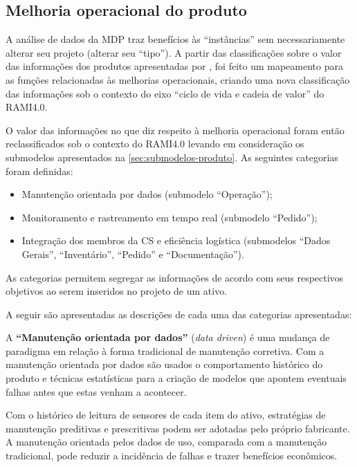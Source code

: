 \subsection{Melhoria operacional do produto}
\label{sub:melhoria-operacional}

A análise de dados da MDP traz benefícios às ``instâncias'' sem necessariamente alterar seu projeto (alterar seu ``tipo''). A partir das classificações sobre o valor das informações dos produtos apresentadas por , foi feito um mapeamento para as funções relacionadas às melhorias operacionais, criando uma nova classificação das informações sob o contexto do eixo ``ciclo de vida e cadeia de valor'' do RAMI4.0.

O valor das informações no que diz respeito à melhoria operacional foram então reclassificados sob o contexto do RAMI4.0 levando em consideração os submodelos apresentados na \autoref{sec:submodelos-produto}. As seguintes categorias foram definidas:

\begin{itemize}
	\item Manutenção orientada por dados (submodelo ``Operação'');
	\item Monitoramento e rastreamento em tempo real (submodelo ``Pedido'');
	\item Integração dos membros da CS e eficiência logística (submodelos ``Dados Gerais'', ``Inventário'', ``Pedido'' e ``Documentação'').
\end{itemize}

As categorias permitem segregar as informações de acordo com seus respectivos objetivos ao serem inseridos no projeto de um ativo.

A seguir são apresentadas as descrições de cada uma das categorias apresentadas:

A \textbf{``Manutenção orientada por dados''} (\textit{data driven}) é uma mudança de paradigma em relação à forma tradicional de manutenção corretiva. Com a manutenção orientada por dados são usados o comportamento histórico do produto e técnicas estatísticas para a criação de modelos que apontem eventuais falhas antes que estas venham a acontecer.

Com o histórico de leitura de sensores de cada item do ativo, estratégias de manutenção preditivas e prescritivas podem ser adotadas pelo próprio fabricante. A manutenção orientada pelos dados de uso, comparada com a manutenção tradicional, pode reduzir a incidência de falhas e trazer benefícios econômicos.

